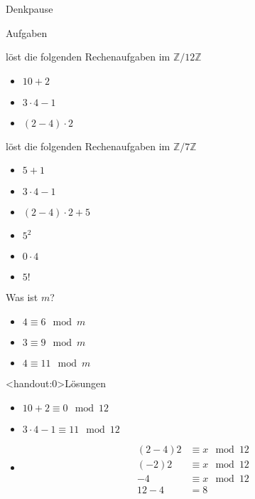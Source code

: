 {
\begin{frame}[fragile]{Denkpause}
	\footnotesize
	\begin{alertblock}{Aufgaben}
	\end{alertblock}
	\begin{block}{löst die folgenden Rechenaufgaben im $\mathbb Z/12\mathbb Z$}
		\begin{multicols}{3}
			\begin{itemize}
				\item $10 + 2$
				\item $3\cdot4-1$
				\item $(2-4)\cdot 2$
			\end{itemize}
		\end{multicols}
	\end{block}
	\begin{block}{löst die folgenden Rechenaufgaben im $\mathbb Z/7\mathbb Z$}
		\begin{multicols}{3}
			\begin{itemize}
				\item $5 + 1$
				\item $3\cdot4-1$
				\item $(2-4)\cdot 2+5$
				\item $5^2$
				\item $0\cdot4$
				\item $5!$
			\end{itemize}
		\end{multicols}
	\end{block}
	\begin{block}{Was ist $m$?}
		\begin{multicols}{3}
			\begin{itemize}
				\item $4 \equiv 6 \mod m$
				\item $3 \equiv 9 \mod m$
				\item $4 \equiv 11 \mod m$
			\end{itemize}
		\end{multicols}
	\end{block}
\end{frame}

\begin{frame}<handout:0>{Lösungen}
	\begin{itemize}[<+- | alert@+>]
		\item $10+2 \equiv 0 \mod 12$
		\item $3\cdot 4-1 \equiv 11 \mod 12$
		\item
		      \begin{align*}
			      (2-4)2 & \equiv x \mod 12 \\
			      (-2)2  & \equiv x \mod 12 \\
			      -4     & \equiv x \mod 12 \\
			      12-4   & =8
		      \end{align*}


\end{itemize}
\end{frame}}
